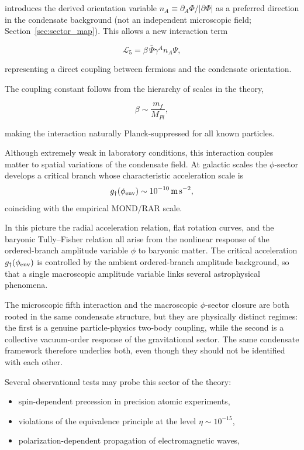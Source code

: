 \documentclass[11pt,a4paper]{article}
\numberwithin{equation}{section}
\begin{document}
introduces the derived orientation variable
$n_A \equiv \partial_A\Phi/|\partial\Phi|$
as a preferred direction in the condensate background
(not an independent microscopic field; Section~\ref{sec:sector_map}).
This allows a new interaction term

\begin{equation}
\mathcal{L}_5
=
\beta\,\bar{\Psi}\gamma^A n_A \Psi ,
\end{equation}

representing a direct coupling between fermions and the condensate
orientation.

The coupling constant follows from the hierarchy of scales in the
theory,

\begin{equation}
\beta \sim \frac{m_f}{M_{Pl}},
\end{equation}

making the interaction naturally Planck-suppressed for all known
particles.

Although extremely weak in laboratory conditions, this interaction
couples matter to spatial variations of the condensate field.
At galactic scales the $\phi$-sector develops a critical branch
whose characteristic acceleration scale is
\begin{equation}
g_\dagger(\phi_{\rm env}) \sim 10^{-10}\,\mathrm{m\,s^{-2}},
\end{equation}
coinciding with the empirical MOND/RAR scale.

In this picture the radial acceleration relation, flat rotation
curves, and the baryonic Tully--Fisher relation all arise from
the nonlinear response of the ordered-branch amplitude variable $\phi$ to
baryonic matter.  The critical acceleration
$g_\dagger(\phi_{\rm env})$ is controlled by the ambient
ordered-branch amplitude background, so that a single macroscopic
amplitude variable links several astrophysical phenomena.

The microscopic fifth interaction and the macroscopic $\phi$-sector
closure are both rooted in the same condensate structure, but they are
physically distinct regimes: the first is a genuine particle-physics
two-body coupling, while the second is a collective vacuum-order response
of the gravitational sector.
The same condensate framework therefore underlies both, even though
they should not be identified with each other.

Several observational tests may probe this sector of the theory:

\begin{itemize}

\item spin-dependent precession in precision atomic experiments,

\item violations of the equivalence principle at the level
$\eta \sim 10^{-15}$,

\item polarization-dependent propagation of electromagnetic waves,

\end{itemize}
\end{document}
